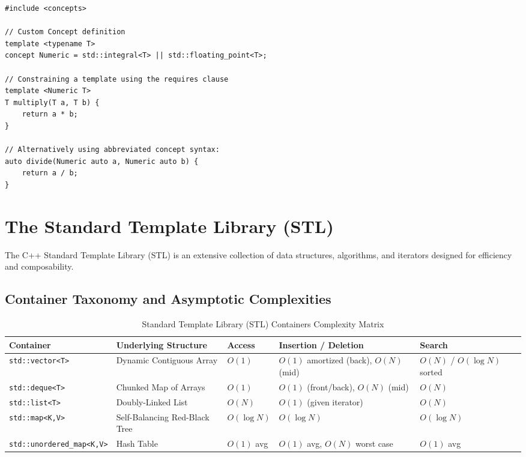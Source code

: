 \documentclass[10pt,journal,compsoc,onecolumn]{IEEEtran}
\begin{document}
\begin{verbatim}
#include <concepts>

// Custom Concept definition
template <typename T>
concept Numeric = std::integral<T> || std::floating_point<T>;

// Constraining a template using the requires clause
template <Numeric T>
T multiply(T a, T b) {
    return a * b;
}

// Alternatively using abbreviated concept syntax:
auto divide(Numeric auto a, Numeric auto b) {
    return a / b;
}
\end{verbatim}

\section{The Standard Template Library (STL)}
\label{sec:stl}

The C++ Standard Template Library (STL) is an extensive collection of data structures, algorithms, and iterators designed for efficiency and composability.

\subsection{Container Taxonomy and Asymptotic Complexities}

\begin{table}[h]
\centering
\caption{Standard Template Library (STL) Containers Complexity Matrix}
\begin{tabular}{lllll}
\toprule
\textbf{Container} & \textbf{Underlying Structure} & \textbf{Access} & \textbf{Insertion / Deletion} & \textbf{Search} \\
\midrule
\texttt{std::vector<T>} & Dynamic Contiguous Array & $O(1)$ & $O(1)$ amortized (back), $O(N)$ (mid) & $O(N)$ / $O(\log N)$ sorted \\
\texttt{std::deque<T>} & Chunked Map of Arrays & $O(1)$ & $O(1)$ (front/back), $O(N)$ (mid) & $O(N)$ \\
\texttt{std::list<T>} & Doubly-Linked List & $O(N)$ & $O(1)$ (given iterator) & $O(N)$ \\
\texttt{std::map<K,V>} & Self-Balancing Red-Black Tree & $O(\log N)$ & $O(\log N)$ & $O(\log N)$ \\
\texttt{std::unordered\_map<K,V>} & Hash Table & $O(1)$ avg & $O(1)$ avg, $O(N)$ worst case & $O(1)$ avg \\
\bottomrule
\end{tabular}
\end{table}
\end{document}
